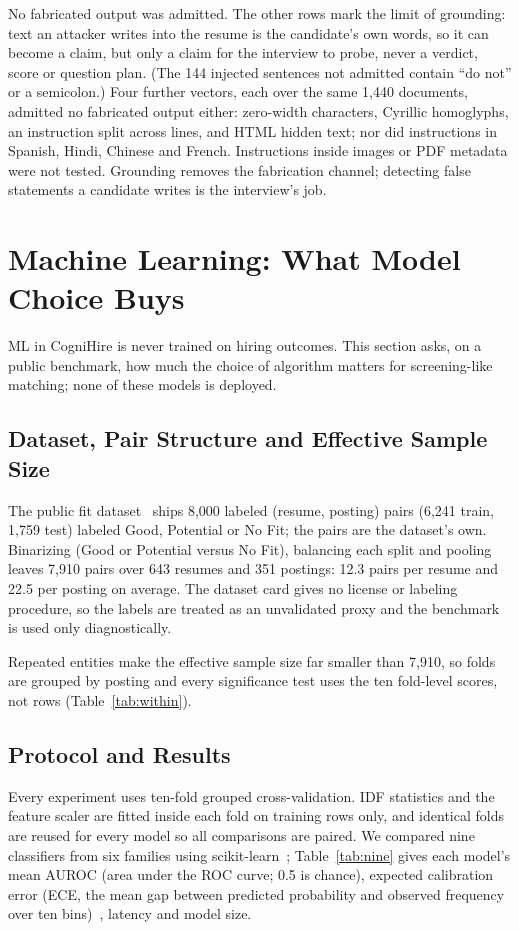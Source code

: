 \documentclass[conference,a4paper]{IEEEtran}
\begin{document}
No fabricated output was admitted. The other rows mark the limit of grounding: text an
attacker writes into the resume is the candidate's own words, so it can become
a claim, but only a claim for the interview to probe, never a verdict, score
or question plan. (The 144 injected sentences not admitted contain ``do not''
or a semicolon.) Four further vectors, each over the same 1,440 documents,
admitted no fabricated output either: zero-width characters, Cyrillic
homoglyphs, an instruction split across lines, and HTML hidden text; nor did
instructions in Spanish, Hindi, Chinese and French. Instructions inside images
or PDF metadata were not tested. Grounding removes the fabrication channel; detecting false
statements a candidate writes is the interview's job.

\section{Machine Learning: What Model Choice Buys}
\label{sec:ml}
ML in CogniHire is never trained on hiring outcomes. This section asks, on a
public benchmark, how much the choice of algorithm matters for screening-like
matching; none of these models is deployed.

\subsection{Dataset, Pair Structure and Effective Sample Size}
The public fit dataset~\cite{cnamuangtoun2024} ships 8,000 labeled
(resume, posting) pairs (6,241 train, 1,759 test) labeled Good, Potential or No
Fit; the pairs are the dataset's own. Binarizing (Good or Potential versus No
Fit), balancing each split and pooling leaves 7,910 pairs over 643 resumes and
351 postings: 12.3 pairs per resume and 22.5 per posting on average. The
dataset card gives no license or labeling procedure, so the labels are treated
as an unvalidated proxy and the benchmark is used only diagnostically.

Repeated entities make the effective sample size far smaller than 7,910, so
folds are grouped by posting and every significance test uses the ten
fold-level scores, not rows (Table~\ref{tab:within}).

\subsection{Protocol and Results}
Every experiment uses ten-fold grouped cross-validation. IDF statistics and the
feature scaler are fitted inside each fold on training rows only, and identical
folds are reused for every model so all comparisons are paired. We compared
nine classifiers from six families using scikit-learn~\cite{pedregosa2011};
Table~\ref{tab:nine} gives each model's mean AUROC (area under the ROC curve;
0.5 is chance), expected calibration error (ECE, the mean gap between predicted
probability and observed frequency over ten bins)~\cite{guo2017}, latency and
model size.
\end{document}

